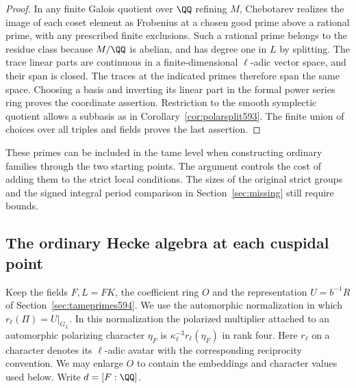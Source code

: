 \documentclass[a4paper,11pt]{article}
\theoremstyle{definition}
\theoremstyle{remark}
\numberwithin{equation}{section}
\begin{document}
\begin{proof}
In any finite Galois quotient over \(\QQ\) refining \(M\),
Chebotarev realizes the image of each coset element as
Frobenius at a chosen good prime above a rational prime,
with any prescribed finite exclusions. Such a rational
prime belongs to the residue class because \(M/\QQ\) is
abelian, and has degree one in \(L\) by splitting.
The trace linear parts are continuous in a finite-dimensional
\(\ell\)-adic vector space, and their span is closed.
The traces at the indicated primes therefore span the same
space. Choosing a basis and inverting its linear part in the
formal power series ring proves the coordinate assertion.
Restriction to the smooth symplectic quotient allows a
subbasis as in Corollary~\ref{cor:polarsplit593}. The finite
union of choices over all triples and fields proves the last
assertion.
\end{proof}

These primes can be included in the tame level when constructing
ordinary families through the two starting points. The argument
controls the cost of adding them to the strict local conditions.
The sizes of the original strict groups and the signed integral
period comparison in Section~\ref{sec:missing} still require bounds.


\subsection{The ordinary Hecke algebra at each cuspidal point}
\label{sec:heckeseeds595}

Keep the fields \(F,L=FK\), the coefficient ring \(O\) and
the representation \(U=b^{-1}R\) of Section~\ref{sec:tameprimes594}.
We use the automorphic normalization in which
\(r_\ell(\Pi)=U|_{G_L}\). In this normalization the
polarized multiplier attached to an automorphic polarizing
character \(\eta_F\) is \(\kappa_\ell^{-3}r_\ell(\eta_F)\)
in rank four. Here \(r_\ell\) on a character denotes its
\(\ell\)-adic avatar with the corresponding reciprocity
convention. We may enlarge \(O\) to contain the embeddings
and character values used below. Write \(d=[F:\QQ]\).
\end{document}

